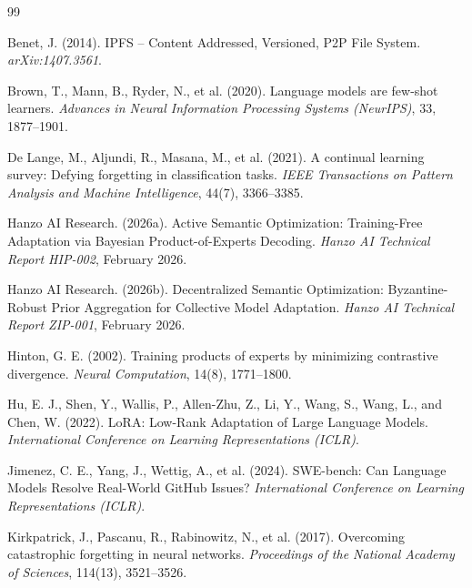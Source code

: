 \documentclass[11pt]{article}
\begin{document}

\begin{thebibliography}{99}

Benet, J. (2014).
\newblock IPFS -- Content Addressed, Versioned, P2P File System.
\newblock \emph{arXiv:1407.3561}.

Brown, T., Mann, B., Ryder, N., et al. (2020).
\newblock Language models are few-shot learners.
\newblock \emph{Advances in Neural Information Processing Systems (NeurIPS)}, 33, 1877--1901.

De Lange, M., Aljundi, R., Masana, M., et al. (2021).
\newblock A continual learning survey: Defying forgetting in classification tasks.
\newblock \emph{IEEE Transactions on Pattern Analysis and Machine Intelligence}, 44(7), 3366--3385.

Hanzo AI Research. (2026a).
\newblock Active Semantic Optimization: Training-Free Adaptation via Bayesian
  Product-of-Experts Decoding.
\newblock \emph{Hanzo AI Technical Report HIP-002}, February 2026.

Hanzo AI Research. (2026b).
\newblock Decentralized Semantic Optimization: Byzantine-Robust Prior
  Aggregation for Collective Model Adaptation.
\newblock \emph{Hanzo AI Technical Report ZIP-001}, February 2026.

Hinton, G. E. (2002).
\newblock Training products of experts by minimizing contrastive divergence.
\newblock \emph{Neural Computation}, 14(8), 1771--1800.

Hu, E. J., Shen, Y., Wallis, P., Allen-Zhu, Z., Li, Y., Wang, S., Wang, L., and Chen, W. (2022).
\newblock LoRA: Low-Rank Adaptation of Large Language Models.
\newblock \emph{International Conference on Learning Representations (ICLR)}.

Jimenez, C. E., Yang, J., Wettig, A., et al. (2024).
\newblock SWE-bench: Can Language Models Resolve Real-World GitHub Issues?
\newblock \emph{International Conference on Learning Representations (ICLR)}.

Kirkpatrick, J., Pascanu, R., Rabinowitz, N., et al. (2017).
\newblock Overcoming catastrophic forgetting in neural networks.
\newblock \emph{Proceedings of the National Academy of Sciences}, 114(13), 3521--3526.


\end{thebibliography}
\end{document}
